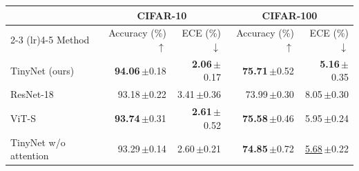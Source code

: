 \begin{tabular}{lrrrr}
\toprule
 & \multicolumn{2}{c}{CIFAR-10} & \multicolumn{2}{c}{CIFAR-100} \\
\cmidrule(lr){2-3} \cmidrule(lr){4-5}
Method & Accuracy (\%) $\uparrow$ & ECE (\%) $\downarrow$ & Accuracy (\%) $\uparrow$ & ECE (\%) $\downarrow$ \\
\midrule
TinyNet (ours) & \textbf{94.06}\,{\scriptsize$\pm$0.18} & \textbf{2.06}\,{\scriptsize$\pm$0.17} & \textbf{75.71}\,{\scriptsize$\pm$0.52} & \textbf{5.16}\,{\scriptsize$\pm$0.35} \\
ResNet-18 & 93.18\,{\scriptsize$\pm$0.22} & 3.41\,{\scriptsize$\pm$0.36} & 73.99\,{\scriptsize$\pm$0.30} & 8.05\,{\scriptsize$\pm$0.30} \\
ViT-S & \textbf{93.74}\,{\scriptsize$\pm$0.31} & \textbf{2.61}\,{\scriptsize$\pm$0.52} & \textbf{75.58}\,{\scriptsize$\pm$0.46} & 5.95\,{\scriptsize$\pm$0.24} \\
TinyNet w/o attention & 93.29\,{\scriptsize$\pm$0.14} & 2.60\,{\scriptsize$\pm$0.21} & \textbf{74.85}\,{\scriptsize$\pm$0.72} & \underline{5.68}\,{\scriptsize$\pm$0.22} \\
\bottomrule
\end{tabular}
